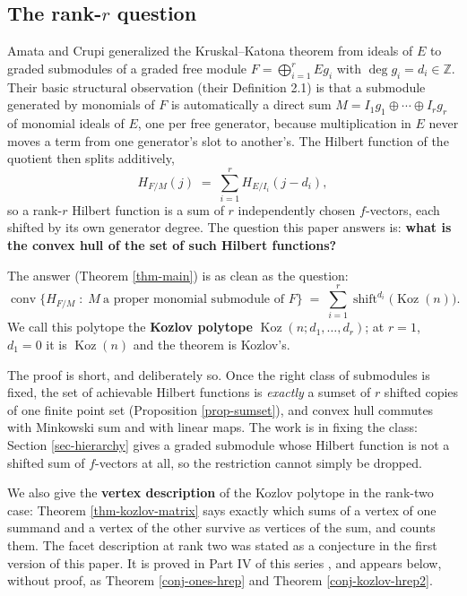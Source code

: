 \documentclass[11pt, a4paper, abstract=yes]{scrartcl}
\theoremstyle{definition}
\theoremstyle{remark}
\theoremstyle{plain}
\newcommand{\Koz}{\operatorname{Koz}}
\newcommand{\shift}{\operatorname{shift}}
\newcommand{\conv}{\operatorname{conv}}
\let\autocite\cite
\begin{document}
\subsection{The rank-\(r\) question}
\label{sec:org3edf4ef}

Amata and Crupi \autocite{AmataCrupi2020KK,AmataCrupi2020} generalized the Kruskal--Katona theorem from ideals of \(E\) to graded
submodules of a graded free module \(F=\bigoplus_{i=1}^rEg_i\) with \(\deg g_i=d_i\in\mathbb Z\).
Their basic structural observation (their Definition 2.1) is that a submodule generated by monomials
of \(F\) is automatically a direct sum \(M=I_1g_1\oplus\cdots\oplus I_rg_r\) of monomial ideals of
\(E\), one per free generator, because multiplication in \(E\) never moves a term from one
generator's slot to another's. The Hilbert function of the quotient then splits additively,
\begin{equation}\label{eq:eq-3}
  H_{F/M}(j)\;=\;\sum_{i=1}^{r}H_{E/I_i}(j-d_i),
\end{equation}
so a rank-\(r\) Hilbert function is a sum of \(r\) independently chosen \(f\)-vectors, each shifted
by its own generator degree. The question this paper answers is: \textbf{what is the convex hull of the set
of such Hilbert functions?}

The answer (Theorem \ref{thm-main}) is as clean as the question:
\begin{equation}\label{eq:eq-4}
  \conv\bigl\lbrace H_{F/M}\;:\;M\ \text{a proper monomial submodule of }F\bigr\rbrace
  \;=\;\sum_{i=1}^{r}\shift^{d_i}\bigl(\Koz(n)\bigr).
\end{equation}
We call this polytope the \textbf{Kozlov polytope} \(\Koz(n;d_1,\dots,d_r)\); at \(r=1\), \(d_1=0\) it is
\(\Koz(n)\) and the theorem is Kozlov's.

The proof is short, and deliberately so. Once the right class of submodules is fixed, the set of
achievable Hilbert functions is \emph{exactly} a sumset of \(r\) shifted copies of one finite point set
(Proposition \ref{prop-sumset}), and convex hull commutes with Minkowski sum and with linear maps. The
work is in fixing the class: Section \ref{sec-hierarchy} gives a graded submodule whose Hilbert
function is not a shifted sum of \(f\)-vectors at all, so the restriction cannot simply be dropped.

We also give the \textbf{vertex description} of the Kozlov polytope in the rank-two case: Theorem
\ref{thm-kozlov-matrix} says exactly which sums of a vertex of one summand and a vertex of the other
survive as vertices of the sum, and counts them. The facet description at rank two was stated as a
conjecture in the first version of this paper. It is proved in Part IV of this series
\autocite{SnellmanArticle4}, and appears below, without proof, as Theorem \ref{conj-ones-hrep} and
Theorem \ref{conj-kozlov-hrep2}.
\end{document}
